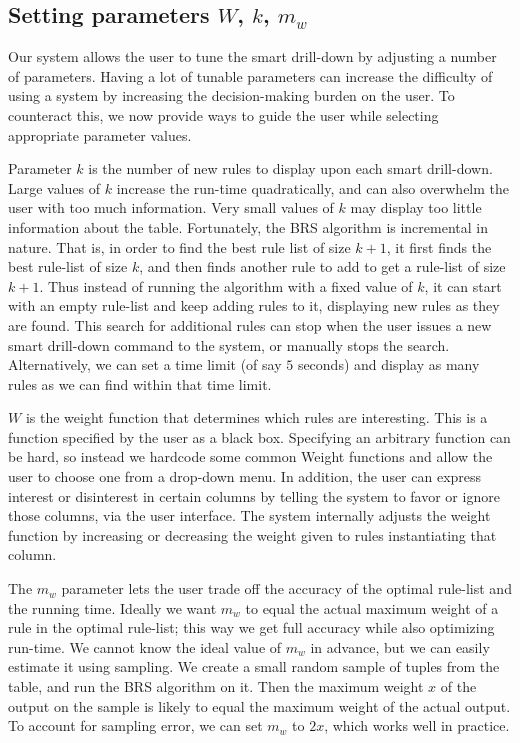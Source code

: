 \documentclass[10pt,journal,compsoc]{IEEEtran}
\newcommand{\techreporttext}[1]{#1}
\begin{document}
\techreporttext{
\subsection{Setting parameters $W$, $k$, $m_w$}\label{sec:setting-paramters}
Our system allows the user to tune the smart drill-down by adjusting a number of parameters. Having a lot of tunable parameters can increase the difficulty of using a system by increasing the decision-making burden on the user. To counteract this, we now provide ways to guide the user while selecting appropriate parameter values.

Parameter $k$ is the number of new rules to display upon each smart drill-down. Large values of $k$ increase the run-time quadratically, and can also overwhelm the user with too much information. Very small values of $k$ may display too little information about the table. Fortunately, the BRS algorithm is incremental in nature. That is, in order to find the best rule list of size $k+1$, it first finds the best rule-list of size $k$, and then finds another rule to add to get a rule-list of size $k+1$. Thus instead of running the algorithm with a fixed value of $k$, it can start with an empty rule-list and keep adding rules to it, displaying new rules as they are found. This search for additional rules can stop when the user issues a new smart drill-down command to the system, or manually stops the search. Alternatively, we can set a time limit (of say $5$ seconds) and display as many rules as we can find within that time limit.

$W$ is the weight function that determines which rules are interesting. This is a function specified by the user as a black box. Specifying an arbitrary function can be hard, so instead we hardcode some common Weight functions and allow the user to choose one from a drop-down menu. In addition, the user can express interest or disinterest in certain columns by telling the system to favor or ignore those columns, via the user interface. The system internally adjusts the weight function by increasing or decreasing the weight given to rules instantiating that column.

The $m_w$ parameter lets the user trade off the accuracy of the optimal rule-list and the running time. Ideally we want $m_w$ to equal the actual maximum weight of a rule in the optimal rule-list; this way we get full accuracy while also optimizing run-time. We cannot know the ideal value of $m_w$ in advance, but we can easily estimate it using sampling. We create a small random sample of tuples from the table, and run the BRS algorithm on it. Then the maximum weight $x$ of the output on the sample is likely to equal the maximum weight of the actual output. To account for sampling error, we can set $m_w$ to $2x$, which works well in practice.
}
\end{document}
